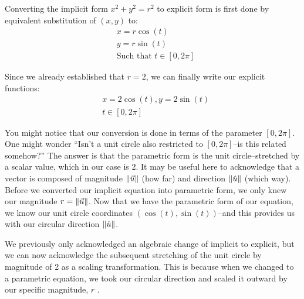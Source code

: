 \documentclass[12pt, letterpaper]{article}
\newcommand{\Lr}{\(r\) }
\newcommand{\xy}{\((x,y)\) }
\begin{document}
	Converting the implicit form \(x^{2}+y^{2}=r^{2}\) to explicit form is first done by equivalent substitution of \xy to:
	\begin{equation*}
		\begin{split}
			&x = r\cos(t) \\
			&y = r\sin(t) \\
			&\text{Such that }t \in [0, 2\pi]
		\end{split}
	\end{equation*}
	
	Since we already established that \(r=2\), we can finally write our explicit functions:
	\begin{equation*}
		\begin{split}
			&x = 2\cos(t), y = 2\sin(t) \\
			&t \in [0, 2\pi]
		\end{split}
	\end{equation*}
	
	You might notice that our conversion is done in terms of the parameter \([0,2\pi]\). One might wonder ``Isn't a unit circle also restricted to \([0,2\pi]\)--is this related somehow?'' The answer is that the parametric form is the unit circle--stretched by a scalar value, which in our case is 2. It may be useful here to acknowledge that a vector is composed of magnitude \(\left\lVert\vec{u}\right\rVert\) (how far) and direction \(\left\lVert\hat{u}\right\rVert\) (which way). Before we converted our implicit equation into parametric form, we only knew our magnitude \(r=\left\lVert\vec{u}\right\rVert\). Now that we have the parametric form of our equation, we know our unit circle coordinates \((\cos(t), \sin(t))\)--and this provides us with our circular direction \(\left\lVert\hat{u}\right\rVert\).
	
	We previously only acknowledged an algebraic change of implicit to explicit, but we can now acknowledge the subsequent stretching of the unit circle by magnitude of 2 as a scaling transformation. This is because when we changed to a parametric equation, we took our circular direction and scaled it outward by our specific magnitude, \Lr.
	
\end{document}

